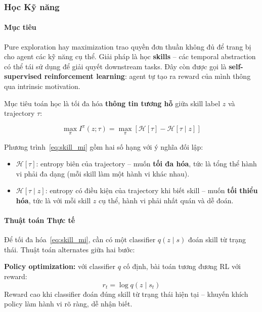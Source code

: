 \subsubsection{Học Kỹ năng}

\paragraph{Mục tiêu}

Pure exploration hay maximization trao quyền đơn thuần không đủ để
trang bị cho agent các kỹ năng cụ thể. Giải pháp là học
\textbf{skills} -- các temporal abstraction có thể tái sử dụng để
giải quyết downstream tasks. Đây còn được gọi là
\textbf{self-supervised reinforcement learning}: agent tự tạo ra reward
của mình thông qua intrinsic motivation.

Mục tiêu toán học là tối đa hóa \textbf{thông tin tương hỗ} giữa skill
label $z$ và trajectory $\tau$:

\begin{equation}
    \max_\pi I^\pi(z; \tau) = \max_\pi \left[ \mathcal{H}[\tau] -
    \mathcal{H}[\tau \mid z] \right]
    \label{eq:skill_mi}
\end{equation}

Phương trình~\eqref{eq:skill_mi} gồm hai số hạng với ý nghĩa đối lập:
\begin{itemize}
    \item $\mathcal{H}[\tau]$: entropy biên của trajectory -- muốn
    \textbf{tối đa hóa}, tức là tổng thể hành vi phải đa dạng (mỗi
    skill làm một hành vi khác nhau).
    \item $\mathcal{H}[\tau \mid z]$: entropy có điều kiện của
    trajectory khi biết skill -- muốn \textbf{tối thiểu hóa}, tức là
    với mỗi skill $z$ cụ thể, hành vi phải nhất quán và dễ đoán.
\end{itemize}

\paragraph{Thuật toán Thực tế}

Để tối đa hóa~\eqref{eq:skill_mi}, cần có một classifier $q(z \mid s)$
đoán skill từ trạng thái. Thuật toán alternates giữa hai bước:

\textbf{Policy optimization:} với classifier $q$ cố định, bài toán
tương đương RL với reward:
\begin{equation}
    r_t = \log q(z \mid s_t)
    \label{eq:skill_reward}
\end{equation}
Reward cao khi classifier đoán đúng skill từ trạng thái hiện tại --
khuyến khích policy làm hành vi rõ ràng, dễ nhận biết.


